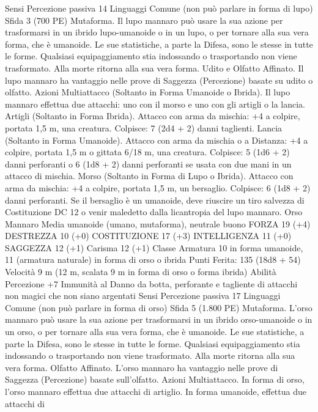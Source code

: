 \begin{multicols}{2}
Sensi Percezione passiva 14
Linguaggi Comune (non può parlare in forma di lupo)
Sfida 3 (700 PE)
Mutaforma. Il lupo mannaro può usare la sua azione per
trasformarsi in un ibrido lupo-umanoide o in un lupo, o per
tornare alla sua vera forma, che è umanoide. Le sue statistiche, a
parte la Difesa, sono le stesse in tutte le forme. Qualsiasi
equipaggiamento stia indossando o trasportando non viene
trasformato. Alla morte ritorna alla sua vera forma.
Udito e Olfatto Affinato. Il lupo mannaro ha vantaggio nelle
prove di Saggezza (Percezione) basate su udito o olfatto.
Azioni
Multiattacco (Soltanto in Forma Umanoide o Ibrida). Il lupo
mannaro effettua due attacchi: uno con il morso e uno con gli
artigli o la lancia.
Artigli (Soltanto in Forma Ibrida). Attacco con arma da
mischia: +4 a colpire, portata 1,5 m, una creatura.
Colpisce: 7 (2d4 + 2) danni taglienti.
Lancia (Soltanto in Forma Umanoide). Attacco con arma da
mischia o a Distanza: +4 a colpire, portata 1,5 m o gittata 6/18
m, una creatura.
Colpisce: 5 (1d6 + 2) danni perforanti o 6 (1d8 + 2) danni
perforanti se usata con due mani in un attacco di mischia.
Morso (Soltanto in Forma di Lupo o Ibrida). Attacco con arma
da mischia: +4 a colpire, portata 1,5 m, un bersaglio.
Colpisce: 6 (1d8 + 2) danni perforanti. Se il bersaglio è un
umanoide, deve riuscire un tiro salvezza di Costituzione DC 12 o
venir maledetto dalla licantropia del lupo mannaro.
Orso Mannaro
Media umanoide (umano, mutaforma), neutrale buono
FORZA 19 (+4)
DESTREZZA 10 (+0)
COSTITUZIONE 17 (+3)
INTELLIGENZA 11 (+0)
SAGGEZZA 12 (+1)
Carisma 12 (+1)
Classe Armatura 10 in forma umanoide, 11 (armatura naturale)
in forma di orso o ibrida
\hspace*{0pt}\hfill{Punti Ferita}: 135 (18d8 + 54)
Velocità 9 m (12 m, scalata 9 m in forma di orso o forma ibrida)
Abilità Percezione +7
Immunità al Danno da botta, perforante e tagliente di
attacchi non magici che non siano argentati
Sensi Percezione passiva 17
Linguaggi Comune (non può parlare in forma di orso)
Sfida 5 (1.800 PE)
Mutaforma. L’orso mannaro può usare la sua azione per
trasformarsi in un ibrido orso-umanoide o in un orso, o per
tornare alla sua vera forma, che è umanoide. Le sue statistiche, a
parte la Difesa, sono le stesse in tutte le forme. Qualsiasi
equipaggiamento stia indossando o trasportando non viene
trasformato. Alla morte ritorna alla sua vera forma.
Olfatto Affinato. L’orso mannaro ha vantaggio nelle prove di
Saggezza (Percezione) basate sull’olfatto.
Azioni
Multiattacco. In forma di orso, l’orso mannaro effettua due
attacchi di artiglio. In forma umanoide, effettua due attacchi di

\end{multicols}

